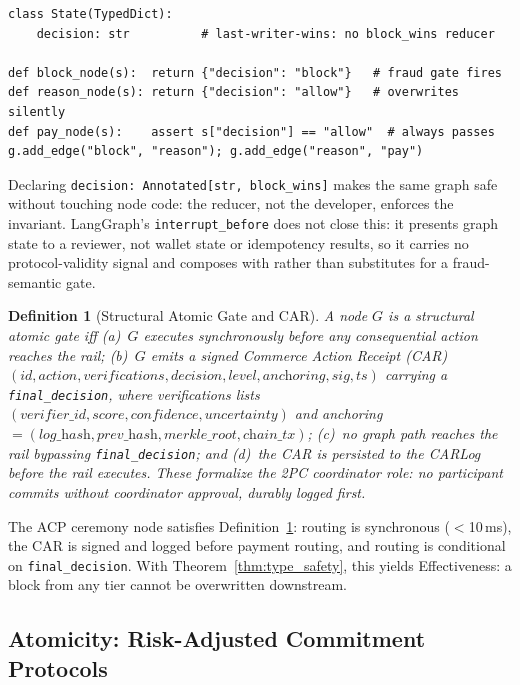 \documentclass{article}
\newtheorem{definition}{Definition}
\begin{document}
\begin{lstlisting}
class State(TypedDict):
    decision: str          # last-writer-wins: no block_wins reducer

def block_node(s):  return {"decision": "block"}   # fraud gate fires
def reason_node(s): return {"decision": "allow"}   # overwrites silently
def pay_node(s):    assert s["decision"] == "allow"  # always passes
g.add_edge("block", "reason"); g.add_edge("reason", "pay")
\end{lstlisting}

\noindent Declaring \texttt{decision: Annotated[str, block\_wins]} makes the same graph safe
without touching node code: the reducer, not the developer, enforces the invariant.
LangGraph's \texttt{interrupt\_before} does not close this: it presents graph state to a
reviewer, not wallet state or idempotency results, so it carries no protocol-validity
signal and composes with rather than substitutes for a fraud-semantic gate.

\begin{definition}[Structural Atomic Gate and CAR]
\label{def:gate}
A node $G$ is a \emph{structural atomic gate} iff (a)~$G$ executes synchronously before any
consequential action reaches the rail; (b)~$G$ emits a signed \emph{Commerce Action Receipt}
(CAR) $(\textit{id},\textit{action},\textit{verifications},\textit{decision},\textit{level},\textit{anchoring},\textit{sig},\textit{ts})$
carrying a \texttt{final\_decision}, where \textit{verifications} lists
$(\textit{verifier\_id},\textit{score},\textit{confidence},\textit{uncertainty})$ and
\textit{anchoring} $=(\textit{log\_hash},\textit{prev\_hash},\textit{merkle\_root},\textit{chain\_tx})$;
(c)~no graph path reaches the rail bypassing \texttt{final\_decision}; and (d)~the CAR is
persisted to the CARLog before the rail executes. These formalize the 2PC coordinator role:
no participant commits without coordinator approval, durably logged first.
\end{definition}

The ACP ceremony node satisfies Definition~\ref{def:gate}: routing is synchronous
($<$10\,ms), the CAR is signed and logged before payment routing, and routing is conditional
on \texttt{final\_decision}. With Theorem~\ref{thm:type_safety}, this yields Effectiveness:
a block from any tier cannot be overwritten downstream.

\subsection{Atomicity: Risk-Adjusted Commitment Protocols}
\label{sec:tiers}
\end{document}
